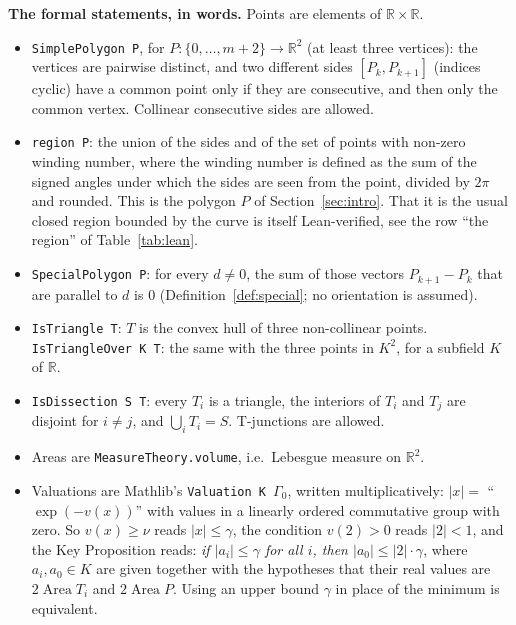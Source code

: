 \documentclass[11pt]{article}
\theoremstyle{definition}
\newcommand{\R}{\mathbb{R}}
\newcommand{\Area}{\operatorname{Area}}
\newcommand{\tL}[1]{\texttt{#1}}
\begin{document}
\textbf{The formal statements, in words.} Points are elements of $\R\times\R$.
\begin{itemize}
\item \tL{SimplePolygon P}, for $P\colon\{0,\dots,m+2\}\to\R^2$ (at least three vertices): the
vertices are pairwise distinct, and two different sides $[P_k,P_{k+1}]$ (indices cyclic) have a
common point only if they are consecutive, and then only the common vertex. Collinear consecutive
sides are allowed.
\item \tL{region P}: the union of the sides and of the set of points with non-zero winding number,
where the winding number is defined as the sum of the signed angles under which the sides are seen
from the point, divided by $2\pi$ and rounded. This is the polygon $P$ of Section~\ref{sec:intro}.
That it is the usual closed region bounded by the curve is itself Lean-verified, see the row
``the region'' of Table~\ref{tab:lean}.
\item \tL{SpecialPolygon P}: for every $d\ne0$, the sum of those vectors $P_{k+1}-P_k$ that are
parallel to $d$ is $0$ (Definition~\ref{def:special}; no orientation is assumed).
\item \tL{IsTriangle T}: $T$ is the convex hull of three non-collinear points. \tL{IsTriangleOver K
T}: the same with the three points in $K^2$, for a subfield $K$ of $\R$.
\item \tL{IsDissection S T}: every $T_i$ is a triangle, the interiors of $T_i$ and $T_j$ are
disjoint for $i\ne j$, and $\bigcup_iT_i=S$. T-junctions are allowed.
\item Areas are \tL{MeasureTheory.volume}, i.e.\ Lebesgue measure on $\R^2$.
\item Valuations are Mathlib's \tL{Valuation K $\Gamma_0$}, written multiplicatively: $|x|=$
``$\exp(-v(x))$'' with values in a linearly ordered commutative group with zero. So $v(x)\ge\nu$
reads $|x|\le\gamma$, the condition $v(2)>0$ reads $|2|<1$, and the Key Proposition reads: \emph{if
$|a_i|\le\gamma$ for all $i$, then $|a_0|\le|2|\cdot\gamma$}, where $a_i,a_0\in K$ are given
together with the hypotheses that their real values are $2\Area T_i$ and $2\Area P$. Using an upper
bound $\gamma$ in place of the minimum is equivalent.
\end{itemize}
\end{document}
